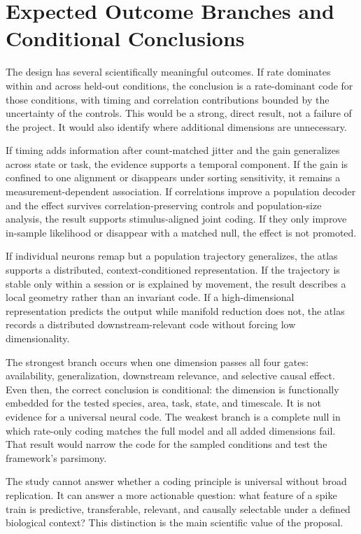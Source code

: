 \documentclass[conference]{IEEEtran}
\begin{document}
\section{Expected Outcome Branches and Conditional Conclusions}
The design has several scientifically meaningful outcomes. If rate dominates within and across held-out conditions, the conclusion is a rate-dominant code for those conditions, with timing and correlation contributions bounded by the uncertainty of the controls. This would be a strong, direct result, not a failure of the project. It would also identify where additional dimensions are unnecessary.

If timing adds information after count-matched jitter and the gain generalizes across state or task, the evidence supports a temporal component. If the gain is confined to one alignment or disappears under sorting sensitivity, it remains a measurement-dependent association. If correlations improve a population decoder and the effect survives correlation-preserving controls and population-size analysis, the result supports stimulus-aligned joint coding. If they only improve in-sample likelihood or disappear with a matched null, the effect is not promoted.

If individual neurons remap but a population trajectory generalizes, the atlas supports a distributed, context-conditioned representation. If the trajectory is stable only within a session or is explained by movement, the result describes a local geometry rather than an invariant code. If a high-dimensional representation predicts the output while manifold reduction does not, the atlas records a distributed downstream-relevant code without forcing low dimensionality.

The strongest branch occurs when one dimension passes all four gates: availability, generalization, downstream relevance, and selective causal effect. Even then, the correct conclusion is conditional: the dimension is functionally embedded for the tested species, area, task, state, and timescale. It is not evidence for a universal neural code. The weakest branch is a complete null in which rate-only coding matches the full model and all added dimensions fail. That result would narrow the code for the sampled conditions and test the framework's parsimony.

The study cannot answer whether a coding principle is universal without broad replication. It can answer a more actionable question: what feature of a spike train is predictive, transferable, relevant, and causally selectable under a defined biological context? This distinction is the main scientific value of the proposal.
\end{document}
